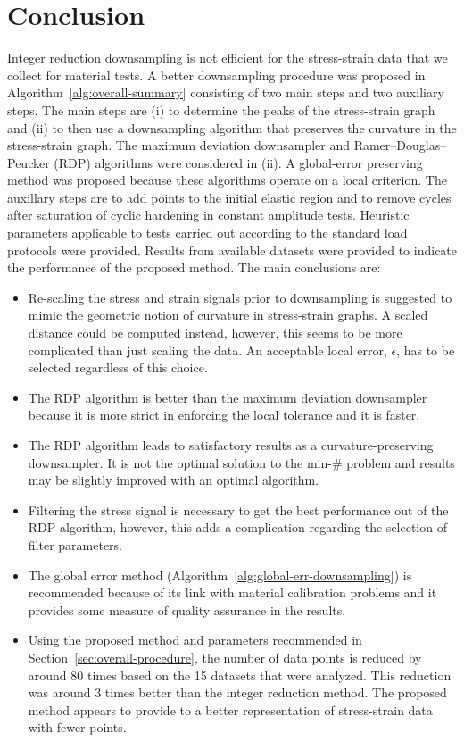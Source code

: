 \documentclass[a4paper,11pt]{article}
\begin{document}
\section{Conclusion}

Integer reduction downsampling is not efficient for the stress-strain data that we collect for material tests.
A better downsampling procedure was proposed in Algorithm~\ref{alg:overall-summary} consisting of two main steps and two auxiliary steps.
The main steps are (i) to determine the peaks of the stress-strain graph and (ii) to then use a downsampling algorithm that preserves the curvature in the stress-strain graph.
The maximum deviation downsampler and Ramer–Douglas–Peucker (RDP) algorithms were considered in (ii).
A global-error preserving method was proposed because these algorithms operate on a local criterion.
The auxillary steps are to add points to the initial elastic region and to remove cycles after saturation of cyclic hardening in constant amplitude tests.
Heuristic parameters applicable to tests carried out according to the standard load protocols were provided.
Results from available datasets were provided to indicate the performance of the proposed method.
The main conclusions are:
\begin{itemize}
    \item Re-scaling the stress and strain signals prior to downsampling is suggested to mimic the geometric notion of curvature in stress-strain graphs. A scaled distance could be computed instead, however, this seems to be more complicated than just scaling the data. An acceptable local error, $\epsilon$, has to be selected regardless of this choice.
    \item The RDP algorithm is better than the maximum deviation downsampler because it is more strict in enforcing the local tolerance and it is faster.
    \item The RDP algorithm leads to satisfactory results as a curvature-preserving downsampler. It is not the optimal solution to the min-\# problem and results may be slightly improved with an optimal algorithm.
    \item Filtering the stress signal is necessary to get the best performance out of the RDP algorithm, however, this adds a complication regarding the selection of filter parameters.
    \item The global error method (Algorithm~\ref{alg:global-err-downsampling}) is recommended because of its link with material calibration problems and it provides some measure of quality assurance in the results.
    \item Using the proposed method and parameters recommended in Section~\ref{sec:overall-procedure}, the number of data points is reduced by around 80 times based on the 15 datasets that were analyzed. This reduction was around 3 times better than the integer reduction method. The proposed method appears to provide to a better representation of stress-strain data with fewer points.
\end{itemize}
\end{document}
